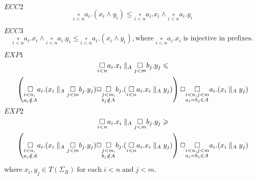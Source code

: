\documentclass{elsarticle}
\theoremstyle{plain}
\theoremstyle{definition}
\begin{document}
   \noindent $ECC2$
      \[\underset{i<n}{\square}a_i.(x_i \wedge y_i)  \leqslant \underset{i< n}{\square}a_i.x_i\wedge \underset{i< n}{\square}a_i.y_i\]

\noindent  $ECC3$
        \[\underset{i< n}{\square}a_i.x_i\wedge \underset{i< n}{\square}a_i.y_i  \leqslant
                \underset{i<n}{\square}a_i.(x_i \wedge y_i),
          \text{where}\;\underset{i<n}{\square}a_i.x_i\;\text{is injective in prefixes}.\]

\noindent $EXP1  $
    \begin{multline*}
      \underset{i< n}{\square}a_i.x_i \parallel_A \underset{j< m}{\square}b_j.y_j  \leqslant\\
      \left(\underset {\begin{subarray}
                   \;i< n,\\
                   a_i \notin A
                \end{subarray}}
                \square a_i.(x_i \parallel_A \underset{j< m}{\square}b_j.y_j) \Box
                \underset {\begin{subarray}
                   \;j< m,\\
                   b_j \notin A
                \end{subarray}}
                \square
                b_j.(\underset{i< n}{\square}a_i.x_i \parallel_A y_j)\right) \Box
        \underset {\begin{subarray}
                   \;i< n,j<m\\
                  a_i= b_j\in A
                \end{subarray}}
                \square
                a_i.(x_i \parallel_A y_j)
    \end{multline*}
     $EXP2  \qquad$
      \begin{multline*}
       \underset{i< n}{\square}a_i.x_i \parallel_A \underset{j< m}{\square}b_j.y_j \geqslant\\
      \left(\underset {\begin{subarray}
                   \;i< n,\\
                   a_i \notin A
                \end{subarray}}
                \square a_i.(x_i \parallel_A \underset{j< m}{\square}b_j.y_j) \Box
                \underset {\begin{subarray}
                   \;j< m,\\
                   b_j \notin A
                \end{subarray}}
                \square
                b_j.(\underset{i< n}{\square}a_i.x_i \parallel_A y_j)\right) \Box
       \underset {\begin{subarray}
                   \;i< n,j<m\\
                  a_i= b_j\in A
                \end{subarray}}
                \square
                a_i.(x_i \parallel_A y_j)
    \end{multline*}
    $\text{where}\;  x_i,y_j \in T(\Sigma_B)\; \text{for each}\; i< n\; \text{and}\; j< m$.\\
\end{document}
